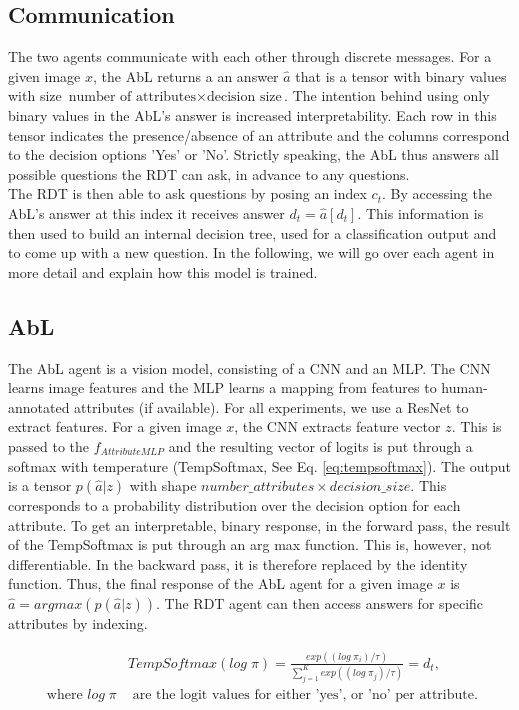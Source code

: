 \documentclass[a4paper,cleardoubleempty,BCOR1cm, 11pt]{report}
\begin{document}
\subsection{Communication}
The two agents communicate with each other through discrete messages. For a given image $x$, the AbL returns a an answer $\hat{a}$ that is a tensor with binary values with size $\text{number of attributes} \times \text{decision size}$. The intention behind using only binary values in the AbL's answer is increased interpretability. Each row in this tensor indicates the presence/absence of an attribute and the columns correspond to the decision options 'Yes' or 'No'. Strictly speaking, the AbL thus answers all possible questions the RDT can ask, in advance to any questions.\\
The RDT is then able to ask questions by posing an index $c_t$. By accessing the AbL's answer at this index it receives answer $d_t = \hat{a}[d_t]$. This information is then used to build an internal decision tree, used for a classification output and to come up with a new question. In the following, we will go over each agent in more detail and explain how this model is trained.


\subsection{AbL}
The AbL agent is a vision model, consisting of a CNN and an MLP. The CNN learns image features and the MLP learns a mapping from features to human-annotated attributes (if available). For all experiments, we use a ResNet \cite{he2016deep} to extract features. For a given image $x$, the CNN extracts feature vector $z$. This is passed to the $f_{AttributeMLP}$ and the resulting vector of logits is put through a softmax with temperature (TempSoftmax, See Eq. \ref{eq:tempsoftmax}). The output is a tensor $p(\hat{a}|z)$ with shape $number\_attributes \times decision\_size$. This corresponds to a probability distribution over the decision option for each attribute. To get an interpretable, binary response, in the forward pass, the result of the TempSoftmax is put through an arg max function. This is, however, not differentiable. In the backward pass, it is therefore replaced by the identity function. Thus, the final response of the AbL agent for a given image $x$ is $\hat{a} = argmax(p(\hat{a}|z))$. The RDT agent can then access answers for specific attributes by indexing.

\begin{align}\label{eq:tempsoftmax}
&TempSoftmax(log\;\pi) = \frac{exp((log\;\pi_i)/\tau)}{\sum_{j=1}^{K}exp((log\;\pi_j)/\tau)} = d_t,\\
\text{ where }
log\;\pi &\text{ are the logit values for either 'yes', or 'no' per attribute.}%
\end{align}
\end{document}
